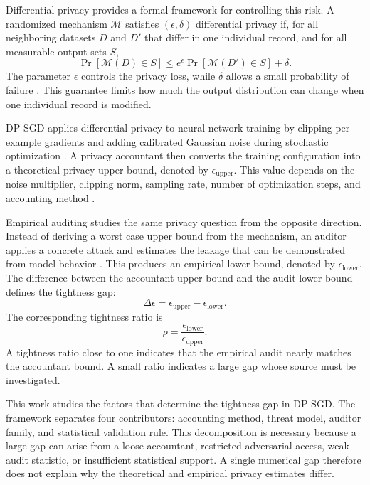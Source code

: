 \documentclass{article}
\begin{document}
Differential privacy provides a formal framework for controlling this risk. A randomized mechanism $\mathcal{M}$ satisfies $(\epsilon,\delta)$ differential privacy if, for all neighboring datasets $D$ and $D'$ that differ in one individual record, and for all measurable output sets $S$,
\[
\Pr[\mathcal{M}(D) \in S]
\leq
e^{\epsilon}\Pr[\mathcal{M}(D') \in S] + \delta .
\]
The parameter $\epsilon$ controls the privacy loss, while $\delta$ allows a small probability of failure \citep{dwork2006calibrating,dwork2014algorithmic}. This guarantee limits how much the output distribution can change when one individual record is modified.

DP-SGD applies differential privacy to neural network training by clipping per example gradients and adding calibrated Gaussian noise during stochastic optimization \citep{abadi2016deep}. A privacy accountant then converts the training configuration into a theoretical privacy upper bound, denoted by $\epsilon_{\mathrm{upper}}$. This value depends on the noise multiplier, clipping norm, sampling rate, number of optimization steps, and accounting method \citep{mironov2017renyi,koskela2020computing,gopi2021numerical,yousefpour2021opacus}.

Empirical auditing studies the same privacy question from the opposite direction. Instead of deriving a worst case upper bound from the mechanism, an auditor applies a concrete attack and estimates the leakage that can be demonstrated from model behavior \citep{jagielski2020auditing,nasr2023tight,steinke2023privacy}. This produces an empirical lower bound, denoted by $\epsilon_{\mathrm{lower}}$. The difference between the accountant upper bound and the audit lower bound defines the tightness gap:
\[
\Delta \epsilon =
\epsilon_{\mathrm{upper}} - \epsilon_{\mathrm{lower}} .
\]
The corresponding tightness ratio is
\[
\rho =
\frac{\epsilon_{\mathrm{lower}}}{\epsilon_{\mathrm{upper}}}.
\]
A tightness ratio close to one indicates that the empirical audit nearly matches the accountant bound. A small ratio indicates a large gap whose source must be investigated.

This work studies the factors that determine the tightness gap in DP-SGD. The framework separates four contributors: accounting method, threat model, auditor family, and statistical validation rule. This decomposition is necessary because a large gap can arise from a loose accountant, restricted adversarial access, weak audit statistic, or insufficient statistical support. A single numerical gap therefore does not explain why the theoretical and empirical privacy estimates differ.
\end{document}
